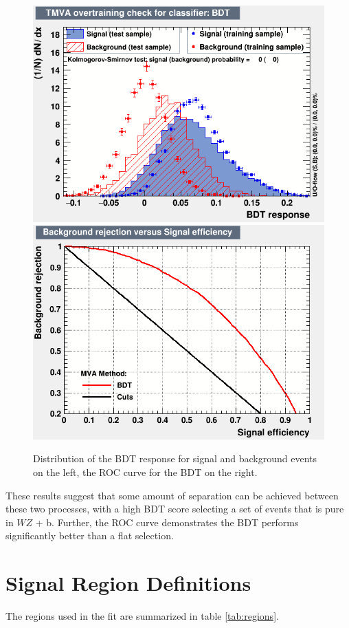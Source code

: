 \documentclass[NOTE, atlasdraft=true, texlive=2016, UKenglish]{\ATLASLATEXPATH atlasdoc}
\begin{document}
\begin{figure}[H]
\center
    \includegraphics[width=.45\linewidth]{tZ_bdt/overtrain_BDT.png}%
    \includegraphics[width=.45\linewidth]{tZ_bdt/roc.png}\\
    \caption{Distribution of the BDT response for signal and background events on the left, the ROC curve for the BDT on the right.}
    \label{fig:tZ_bdt}
\end{figure}

These results suggest that some amount of separation can be achieved between these two processes, with a high BDT score selecting a set of events that is pure in $WZ$ + b. Further, the ROC curve demonstrates the BDT performs significantly better than a flat selection.


\section{Signal Region Definitions}
\label{sec:signal_region}

The regions used in the fit are summarized in table \ref{tab:regions}.
\end{document}
